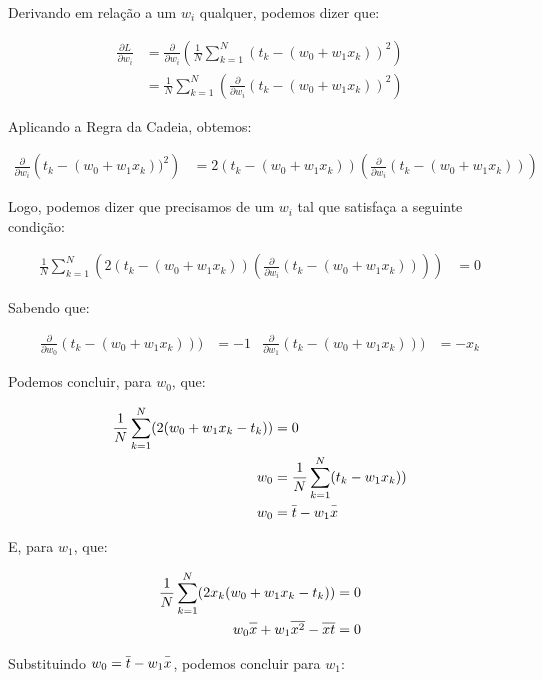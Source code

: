 \documentclass{article}
\begin{document}
Derivando em relação a um $w_i$ qualquer, podemos dizer que:

\begin{align*}
\frac{\partial L}{\partial w_i} &= \frac{\partial}{\partial w_i} \left(\frac{1}{N} \sum_{k=1}^{N}(t_k - (w_0 + w_1x_k))^2\right) \\
&= \frac{1}{N} \sum_{k=1}^{N}\left(\frac{\partial}{\partial w_i} \left(t_k - (w_0 + w_1x_k)\right)^2\right)
\end{align*}

Aplicando a Regra da Cadeia, obtemos:

\begin{align*}
\frac{\partial}{\partial w_i} \left(t_k - (w_0 + w_1x_k))^2\right) &= 2(t_k - (w_0 + w_1x_k))(\frac{\partial}{\partial w_i}(t_k - (w_0 + w_1x_k)))
\end{align*}

Logo, podemos dizer que precisamos de um $w_i$ tal que satisfaça a seguinte condição:

\begin{align*}
\frac{1}{N} \sum_{k=1}^{N}\left(2(t_k - (w_0 + w_1x_k))(\frac{\partial}{\partial w_i}(t_k - (w_0 + w_1x_k)))\right) &= 0
\end{align*}

Sabendo que:

\begin{align*}
\frac{\partial}{\partial w_0}(t_k - (w_0 + w_1x_k))) &= -1 & \frac{\partial}{\partial w_1}(t_k - (w_0 + w_1x_k))) &= -x_k
\end{align*}

Podemos concluir, para $w_0$, que:

\begin{align*}
\frac{1}{N} \sum_{k=1}^{N}(2(w_0 + w_1x_k - t_k)) &= 0 \\
w_0 &= \frac{1}{N} \sum_{k=1}^{N}(t_k - w_1x_k)) \\
w_0 &= \bar{t\vphantom{+1}} - w_1\bar{x\vphantom{+1}}
\end{align*}

E, para $w_1$, que:

\begin{align*}
\frac{1}{N} \sum_{k=1}^{N}(2x_k(w_0 + w_1x_k - t_k)) &= 0 \\
w_0\overline{x\vphantom{+1}} + w_1\overline{x^2\vphantom{+1}} - \overline{xt\vphantom{+1}} &= 0
\end{align*}

Substituindo $w_0 = \bar{t\vphantom{+1}} - w_1\bar{x\vphantom{+1}}$, podemos concluir para $w_1$:
\end{document}
